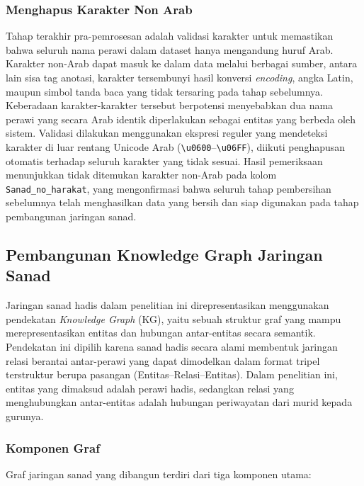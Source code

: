 \subsubsection{Menghapus Karakter Non Arab}
Tahap terakhir pra-pemrosesan adalah validasi karakter untuk memastikan bahwa seluruh nama perawi dalam dataset hanya mengandung huruf Arab. Karakter non-Arab dapat masuk ke dalam data melalui berbagai sumber, antara lain sisa tag anotasi, karakter tersembunyi hasil konversi \textit{encoding}, angka Latin, maupun simbol tanda baca yang tidak tersaring pada tahap sebelumnya. Keberadaan karakter-karakter tersebut berpotensi menyebabkan dua nama perawi yang secara Arab identik diperlakukan sebagai entitas yang berbeda oleh sistem. Validasi dilakukan menggunakan ekspresi reguler yang mendeteksi karakter di luar rentang Unicode Arab (\texttt{\textbackslash u0600}--\texttt{\textbackslash u06FF}), diikuti penghapusan otomatis terhadap seluruh karakter yang tidak sesuai. Hasil pemeriksaan menunjukkan tidak ditemukan karakter non-Arab pada kolom \texttt{Sanad\_no\_harakat}, yang mengonfirmasi bahwa seluruh tahap pembersihan sebelumnya telah menghasilkan data yang bersih dan siap digunakan pada tahap pembangunan jaringan sanad.

\subsection{Pembangunan Knowledge Graph Jaringan Sanad}
\label{subsec:pembangunan-kg}
Jaringan sanad hadis dalam penelitian ini direpresentasikan menggunakan pendekatan \textit{Knowledge Graph} (KG), yaitu sebuah struktur graf yang mampu merepresentasikan entitas dan hubungan antar-entitas secara semantik. Pendekatan ini dipilih karena sanad hadis secara alami membentuk jaringan relasi berantai antar-perawi yang dapat dimodelkan dalam format tripel terstruktur berupa pasangan (Entitas–Relasi–Entitas). Dalam penelitian ini, entitas yang dimaksud adalah perawi hadis, sedangkan relasi yang menghubungkan antar-entitas adalah hubungan periwayatan dari murid kepada gurunya.

\subsubsection{Komponen Graf}
Graf jaringan sanad yang dibangun terdiri dari tiga komponen utama:

